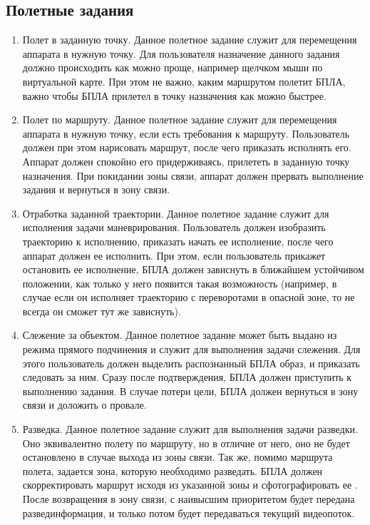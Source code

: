 \documentclass[utf8]{report}
\begin{document}
\subsection{Полетные задания}
\begin{enumerate}
  \item Полет в заданную точку. Данное полетное задание служит для перемещения аппарата в нужную точку. Для пользователя назначение данного задания должно происходить как можно проще, например щелчком мыши по виртуальной карте. При этом не важно, каким маршрутом полетит БПЛА, важно чтобы БПЛА прилетел в точку назначения как можно быстрее.
  \item Полет по маршруту. Данное полетное задание служит для перемещения аппарата в нужную точку, если есть требования к маршруту. Пользователь должен при этом нарисовать маршрут, после чего приказать исполнять его. Аппарат должен спокойно его придерживаясь, прилететь в заданную точку назначения. При покидании зоны связи, аппарат должен прервать выполнение задания и вернуться в зону связи.
  \item Отработка заданной траектории. Данное полетное задание служит для исполнения задачи маневрирования. Пользователь должен изобразить траекторию к исполнению, приказать начать ее исполнение, после чего аппарат должен ее исполнить. При этом, если пользователь прикажет остановить ее исполнение, БПЛА должен зависнуть в ближайшем устойчивом положении, как только у него появится такая возможность (например, в случае если он исполняет траекторию с переворотами в опасной зоне, то не всегда он сможет тут же зависнуть).
  \item Слежение за объектом. Данное полетное задание может быть выдано из режима прямого подчинения и служит для выполнения задачи слежения. Для этого пользователь должен выделить распознанный БПЛА образ, и приказать следовать за ним. Сразу после подтверждения, БПЛА должен приступить к выполнению задания. В случае потери цели, БПЛА должен вернуться в зону связи и доложить о провале.
  \item Разведка. Данное полетное задание служит для выполнения задачи разведки. Оно эквивалентно полету по маршруту, но в отличие от него, оно не будет остановлено в случае выхода из зоны связи. Так же, помимо маршрута полета, задается зона, которую необходимо разведать. БПЛА должен скорректировать маршрут исходя из указанной зоны и сфотографировать ее . После возвращения в зону связи, с наивысшим приоритетом будет передана развединформация, и только потом будет передаваться текущий видеопоток.
\end{enumerate}
\end{document}
